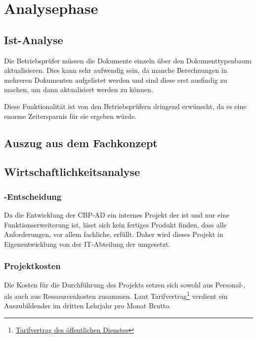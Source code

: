 
\clearpage
\section{Analysephase} 
\label{sec:Analysephase}


\subsection{Ist-Analyse} 
\label{sec:IstAnalyse}

Die Betriebsprüfer müssen die Dokumente einzeln über den Dokumenttypenbaum aktualisieren. Dies kann sehr aufwendig sein, da manche Berechnungen in mehreren Dokumenten aufgelistet werden und sind diese erst ausfindig zu machen, um dann aktualisiert werden zu können.


Diese Funktionalität ist von den Betriebsprüfern dringend erwünscht, da es eine enorme Zeitersparnis für sie ergeben würde.

\subsection{Auszug aus dem Fachkonzept}
\label{sec:AuszugFachkonzept}


\subsection{Wirtschaftlichkeitsanalyse}
\label{sec:Wirtschaftlichkeitsanalyse}

\subsubsection{-Entscheidung}
\label{sec:MakeOrBuyEntscheidung}

Da die Entwicklung der \acs{CBP-AD} ein internes Projekt der \DRV ist und nur eine Funktionserweiterung ist, lässt sich kein fertiges Produkt finden, dass alle Anforderungen, vor allem fachliche, erfüllt. Daher wird dieses Projekt in Eigenentwicklung von der IT-Abteilung der \DRV umgesetzt.

\subsubsection{Projektkosten}
\label{sec:Projektkosten}

Die Kosten für die Durchführung des Projekts setzen sich sowohl aus Personal-, als auch aus Ressourcenkosten zusammen.
Laut Tarifvertrag\footnote{\href{http://www.oeffentlichen-dienst.de/auszubildende/25-tarifvertrag-fuer-den-auszubildende/90-tvaoed-besonderer-teil-bbig.html}{Tarifvertrag des öffentlichen Dienstes}} verdient ein Auszubildender im dritten Lehrjahr pro Monat  Brutto. 

